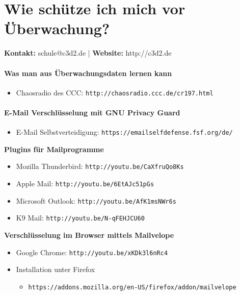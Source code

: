\documentclass[a5paper]{scrartcl}
\begin{document}
\thispagestyle{empty}

\part*{Wie schütze ich mich vor Überwachung?}
\textbf{Kontakt:} schule@c3d2.de | \textbf{Website:} http://c3d2.de
\vspace{2mm}

\subsection*{Was man aus Überwachungsdaten lernen kann}
\begin{itemize}
    \item Chaosradio des CCC: \texttt{http://chaosradio.ccc.de/cr197.html}
\end{itemize}

\subsection*{E-Mail Verschlüsselung mit GNU Privacy Guard}
\begin{itemize}
    \item E-Mail Selbstverteidigung: \texttt{https://emailselfdefense.fsf.org/de/}
\end{itemize}
\textbf{Plugins für Mailprogramme}
\begin{itemize}
   \item Mozilla Thunderbird: \texttt{http://youtu.be/CaXfruQo8Ks}
   \item Apple Mail: \texttt{http://youtu.be/6EtAJc51pGs}  
   \item Microsoft Outlook: \texttt{http://youtu.be/AfK1msNWr6s} 
   \item K9 Mail: \texttt{http://youtu.be/N-qFEHJCU60} 
\end{itemize}
\textbf{Verschlüsselung im Browser mittels Mailvelope}
\begin{itemize}
   \item Google Chrome: \texttt{http://youtu.be/xKDk3l6nRc4}
   \item Installation unter Firefox
      \begin{itemize}
         \item[] \footnotesize{\texttt{https://addons.mozilla.org/en-US/firefox/addon/mailvelope}} 
      \end{itemize}
\end{itemize}
\end{document}
